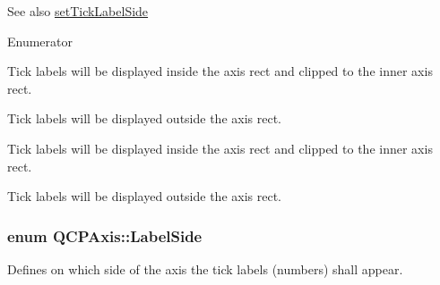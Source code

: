 \begin{DoxySeeAlso}{See also}
\hyperlink{class_q_c_p_axis_a13ec644fc6e22715744c92c6dfa4f0fa}{set\+Tick\+Label\+Side} 
\end{DoxySeeAlso}
\begin{Desc}
\item[Enumerator]\par
\begin{description}
\item[{\em 
ls\+Inside\hypertarget{class_q_c_p_axis_a24b13374b9b8f75f47eed2ea78c37db9aff95f9e416645472248f680fc64c28d1}{}\label{class_q_c_p_axis_a24b13374b9b8f75f47eed2ea78c37db9aff95f9e416645472248f680fc64c28d1}
}]Tick labels will be displayed inside the axis rect and clipped to the inner axis rect. \item[{\em 
ls\+Outside\hypertarget{class_q_c_p_axis_a24b13374b9b8f75f47eed2ea78c37db9a6485a6945fe86bb5acb881c4f45121b0}{}\label{class_q_c_p_axis_a24b13374b9b8f75f47eed2ea78c37db9a6485a6945fe86bb5acb881c4f45121b0}
}]Tick labels will be displayed outside the axis rect. \item[{\em 
ls\+Inside\hypertarget{class_q_c_p_axis_a24b13374b9b8f75f47eed2ea78c37db9aff95f9e416645472248f680fc64c28d1}{}\label{class_q_c_p_axis_a24b13374b9b8f75f47eed2ea78c37db9aff95f9e416645472248f680fc64c28d1}
}]Tick labels will be displayed inside the axis rect and clipped to the inner axis rect. \item[{\em 
ls\+Outside\hypertarget{class_q_c_p_axis_a24b13374b9b8f75f47eed2ea78c37db9a6485a6945fe86bb5acb881c4f45121b0}{}\label{class_q_c_p_axis_a24b13374b9b8f75f47eed2ea78c37db9a6485a6945fe86bb5acb881c4f45121b0}
}]Tick labels will be displayed outside the axis rect. \end{description}
\end{Desc}
\subsubsection[{\texorpdfstring{Label\+Side}{LabelSide}}]{\setlength{\rightskip}{0pt plus 5cm}enum {\bf Q\+C\+P\+Axis\+::\+Label\+Side}}\hypertarget{class_q_c_p_axis_a24b13374b9b8f75f47eed2ea78c37db9}{}\label{class_q_c_p_axis_a24b13374b9b8f75f47eed2ea78c37db9}
Defines on which side of the axis the tick labels (numbers) shall appear.

